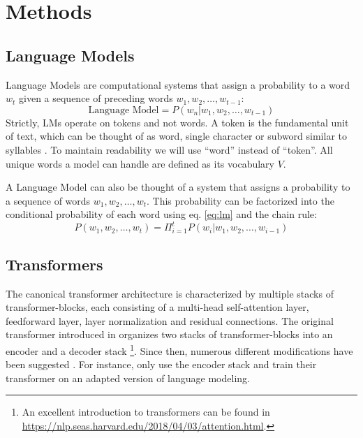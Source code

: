 \section{Methods}


\subsection{Language Models}
Language Models are computational systems that assign a probability to a word $w_t$ given a sequence of preceding words $w_1, w_2, \dots, w_{t-1}$:
\begin{equation}\label{eq:lm}
    \text{Language Model} = P( w_n | w_1, w_2, \dots, w_{t-1})
\end{equation}
Strictly, LMs operate on tokens and not words. A token is the fundamental unit of text, which can be thought of as word, single character or subword similar to syllables \parencite{sennrich_neural_2016}.
To maintain readability we will use ``word'' instead of ``token''.
All unique words a model can handle are defined as its vocabulary $V$.

A Language Model can also be thought of a system that assigns a probability to a sequence of words $w_1, w_2, \dots, w_t$.
This probability can be factorized into the conditional probability of each word using eq. \ref{eq:lm} and the chain rule:
\begin{equation}
    P(w_1, w_2, \dots, w_t) = \Pi_{i=1}^{t} P( w_i | w_1, w_2, \dots, w_{i-1})
\end{equation}


\subsection{Transformers}
The canonical transformer architecture is characterized by multiple stacks of transformer-blocks, each consisting of a multi-head self-attention layer, feedforward layer, layer normalization and residual connections.
The original transformer introduced in \cite{vaswani_attention_2017} organizes two stacks of transformer-blocks into an encoder and a decoder stack
\footnote{An excellent introduction to transformers can be found in \url{https://nlp.seas.harvard.edu/2018/04/03/attention.html}.}.
Since then, numerous different modifications have been suggested \parencite{tay_efficient_2022}. For instance, \cite{devlin_bert_2019} only use the encoder stack and train their transformer on an adapted version of language modeling. %


